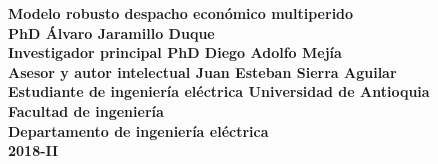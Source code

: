 \documentclass[12pt, letterpaper, titlepage, oneside]{book}
\author{Diego Aldolfo Mejía-Giraldo, Álvaro Jaramillo-Duque, Juan Esteban Sierra-Aguilar}
\title{\myTitle}
\newcommand{\myTitle}{Modelo robusto despacho económico multiperido}
\begin{document}
    \begin{titlepage}
            \centering
            \vfill
            {\bfseries\Large
               \myTitle \\
                \vskip 3cm
                \textbf{PhD Álvaro Jaramillo Duque}
                \\ Investigador principal
                \vskip 1cm
                \textbf{PhD Diego Adolfo Mejía}
                \\ Asesor y autor intelectual
                \vskip 1cm
                \textbf{Juan Esteban Sierra Aguilar}
                \\ Estudiante de ingeniería eléctrica
                \vskip 1cm
                \textbf{Universidad de Antioquia \\
                Facultad de ingeniería \\
                Departamento de ingeniería eléctrica \\
                2018-II}
            }    
            \vfill
    \end{titlepage}
    
    \tableofcontents
    
    
    
    
    
    
    
    
    
    \appendix
    \begin{appendices}
    
    \end{appendices}
    
    
    
\end{document}
